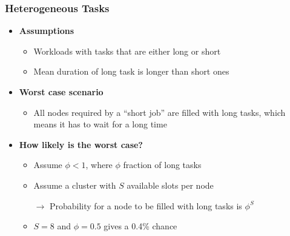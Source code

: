 \begin{frame}
\frametitle{Heterogeneous Tasks}
\begin{itemize}
	\item {\bf Assumptions}
	\begin{itemize}
		\item Workloads with tasks that are either long or short
		\item Mean duration of long task is longer than short ones
	\end{itemize}

\vspace{20pt}

	\item {\bf Worst case scenario}
	\begin{itemize}
		\item All nodes required by a ``short job'' are filled with long tasks, which means it has to wait for a long time
	\end{itemize}

\vspace{20pt}

	\item {\bf How likely is the worst case?}
	\begin{itemize}
		\item Assume $\phi < 1$, where $\phi$ fraction of long tasks
		\item Assume a cluster with $S$ available slots per node
		\item[$\to$] Probability for a node to be filled with long tasks is $\phi^S$
		\item $S=8$ and $\phi = 0.5$ gives a 0.4\% chance 
	\end{itemize}
\end{itemize}
\end{frame}

